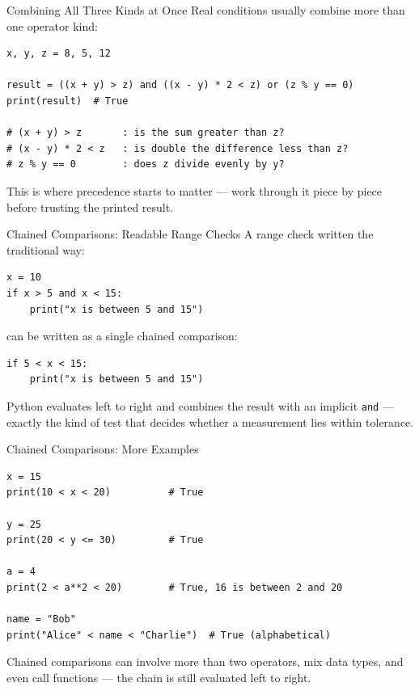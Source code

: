 \documentclass[9pt,aspectratio=169,xcolor=table]{beamer}
\begin{document}
\begin{frame}[fragile]{Combining All Three Kinds at Once}
    \leavevmode
    Real conditions usually combine more than one operator kind:

\begin{lstlisting}
x, y, z = 8, 5, 12

result = ((x + y) > z) and ((x - y) * 2 < z) or (z % y == 0)
print(result)  # True

# (x + y) > z       : is the sum greater than z?
# (x - y) * 2 < z   : is double the difference less than z?
# z % y == 0        : does z divide evenly by y?
\end{lstlisting}

    \vspace{1mm}
    {\small This is where precedence starts to matter --- work through
    it piece by piece before trusting the printed result.}
\end{frame}

\begin{frame}[fragile]{Chained Comparisons: Readable Range Checks}
    \leavevmode
    A range check written the traditional way:

\begin{lstlisting}
x = 10
if x > 5 and x < 15:
    print("x is between 5 and 15")
\end{lstlisting}

    can be written as a single \alert{chained comparison}:

\begin{lstlisting}
if 5 < x < 15:
    print("x is between 5 and 15")
\end{lstlisting}

    \vspace{1mm}
    {\small Python evaluates left to right and combines the result with
    an implicit \texttt{and} --- exactly the kind of test that decides
    whether a measurement lies within tolerance.}
\end{frame}

\begin{frame}[fragile]{Chained Comparisons: More Examples}
    \leavevmode
\begin{lstlisting}
x = 15
print(10 < x < 20)          # True

y = 25
print(20 < y <= 30)         # True

a = 4
print(2 < a**2 < 20)        # True, 16 is between 2 and 20

name = "Bob"
print("Alice" < name < "Charlie")  # True (alphabetical)
\end{lstlisting}

    \vspace{1mm}
    {\small Chained comparisons can involve more than two operators, mix
    data types, and even call functions --- the chain is still evaluated
    left to right.}
\end{frame}
\end{document}
